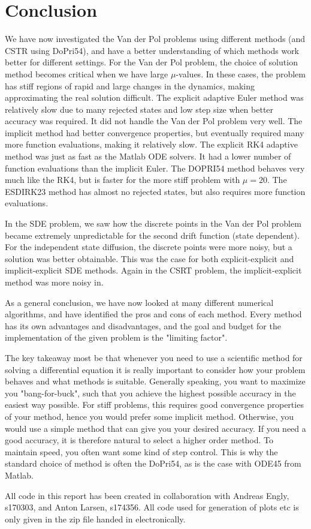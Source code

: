 \chapter{Conclusion}
We have now investigated the Van der Pol problems using different methods (and CSTR using DoPri54), and have a better understanding of which methods work better for different settings. For the Van der Pol problem, the choice of solution method becomes critical when we have large $\mu$-values. In these cases, the problem has stiff regions of rapid and large changes in the dynamics, making approximating the real solution difficult. The explicit adaptive Euler method was relatively slow due to many rejected states and low step size when better accuracy was required. It did not handle the Van der Pol problem very well. The implicit method had better convergence properties, but eventually required many more function evaluations, making it relatively slow. The explicit RK4 adaptive method was just as fast as the Matlab ODE solvers. It had a lower number of function evaluations than the implicit Euler. The DOPRI54 method behaves very much like the RK4, but is faster for the more stiff problem with $\mu = 20$. The ESDIRK23 method has almost no rejected states, but also requires more function evaluations. 

In the SDE problem, we saw  how the discrete points in the Van der Pol problem became extremely unpredictable for the second drift function (state dependent). For the independent state diffusion, the discrete points were more noisy, but a solution was better obtainable. This was the case for both explicit-explicit and implicit-explicit SDE methods. Again in the CSRT problem, the implicit-explicit method was more noisy in.

As a general conclusion, we have now looked at many different numerical algorithms, and have identified the pros and cons of each method. Every method has its own advantages and disadvantages, and the goal and budget for the implementation of the given problem is the "limiting factor". 

The key takeaway most be that whenever you need to use a scientific method for solving a differential equation it is really important to consider how your problem behaves and what methods is suitable. Generally speaking, you want to maximize you "bang-for-buck", such that you achieve the highest possible accuracy in the easiest way possible. For stiff problems, this requires good convergence properties of your method, hence you would prefer some implicit method. Otherwise, you would use a simple method that can give you your desired accuracy. If you need a good accuracy, it is therefore natural to select a higher order method. To maintain speed, you often want some kind of step control. This is why the standard choice of method is often the DoPri54, as is the case with ODE45 from Matlab.

All code in this report has been created in collaboration with Andreas Engly, s170303, and Anton Larsen, s174356. All code used for generation of plots etc is only given in the zip file handed in electronically. 

